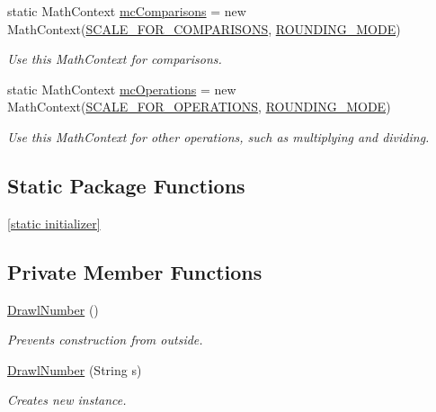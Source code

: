 \begin{DoxyCompactItemize}
static Math\+Context \hyperlink{classcom_1_1aarrelaakso_1_1drawl_1_1_drawl_number_a520b230ee4ceb0e1bef368ace676a954}{mc\+Comparisons} = new Math\+Context(\hyperlink{classcom_1_1aarrelaakso_1_1drawl_1_1_drawl_number_ace1cb62d1ecce8212578d1a13cf5cbc4}{S\+C\+A\+L\+E\+\_\+\+F\+O\+R\+\_\+\+C\+O\+M\+P\+A\+R\+I\+S\+O\+NS}, \hyperlink{classcom_1_1aarrelaakso_1_1drawl_1_1_drawl_number_ab4b44bb0675da90d8f435286911b711e}{R\+O\+U\+N\+D\+I\+N\+G\+\_\+\+M\+O\+DE})
\begin{DoxyCompactList}\small\item\em Use this Math\+Context for comparisons. \end{DoxyCompactList}\item 
static Math\+Context \hyperlink{classcom_1_1aarrelaakso_1_1drawl_1_1_drawl_number_a75a2442ef7cdcfb4dca9aba870ee7108}{mc\+Operations} = new Math\+Context(\hyperlink{classcom_1_1aarrelaakso_1_1drawl_1_1_drawl_number_ab9bb5bf4986830f56f01cb218ba637ce}{S\+C\+A\+L\+E\+\_\+\+F\+O\+R\+\_\+\+O\+P\+E\+R\+A\+T\+I\+O\+NS}, \hyperlink{classcom_1_1aarrelaakso_1_1drawl_1_1_drawl_number_ab4b44bb0675da90d8f435286911b711e}{R\+O\+U\+N\+D\+I\+N\+G\+\_\+\+M\+O\+DE})
\begin{DoxyCompactList}\small\item\em Use this Math\+Context for other operations, such as multiplying and dividing. \end{DoxyCompactList}\end{DoxyCompactItemize}
\subsection*{Static Package Functions}
\begin{DoxyCompactItemize}
\item 
\hyperlink{classcom_1_1aarrelaakso_1_1drawl_1_1_drawl_number_aad8d7aeb9f6e8f549e93b830b5ef5f8d}{\mbox{[}static initializer\mbox{]}}
\end{DoxyCompactItemize}
\subsection*{Private Member Functions}
\begin{DoxyCompactItemize}
\item 
\hyperlink{classcom_1_1aarrelaakso_1_1drawl_1_1_drawl_number_ae870bc04b03801d06c155d5f89e1319e}{Drawl\+Number} ()
\begin{DoxyCompactList}\small\item\em Prevents construction from outside. \end{DoxyCompactList}\item 
\hyperlink{classcom_1_1aarrelaakso_1_1drawl_1_1_drawl_number_ac495cadcbe3f865702f1c9ada7105d69}{Drawl\+Number} (String s)
\begin{DoxyCompactList}\small\item\em Creates new instance. \end{DoxyCompactList}\end{DoxyCompactItemize}
